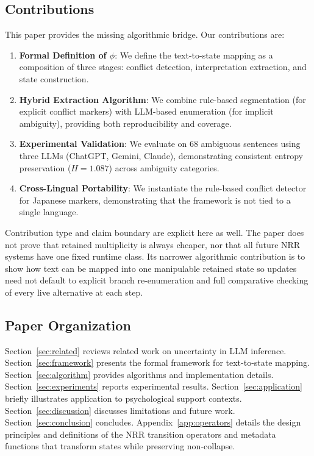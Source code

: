 \documentclass[11pt,a4paper]{article}
\begin{document}
\subsection{Contributions}

This paper provides the missing algorithmic bridge. Our contributions are:

\begin{enumerate}
    \item \textbf{Formal Definition of $\phi$}: We define the text-to-state mapping as a 
          composition of three stages: conflict detection, interpretation extraction, 
          and state construction.
    
    \item \textbf{Hybrid Extraction Algorithm}: We combine rule-based segmentation 
          (for explicit conflict markers) with LLM-based enumeration (for implicit 
          ambiguity), providing both reproducibility and coverage.
    
    \item \textbf{Experimental Validation}: We evaluate on 68 ambiguous sentences 
          using three LLMs (ChatGPT, Gemini, Claude), demonstrating consistent entropy 
          preservation ($H = 1.087$) across ambiguity categories.
    
	    \item \textbf{Cross-Lingual Portability}: We instantiate the rule-based conflict 
	          detector for Japanese markers, demonstrating that the framework is not 
	          tied to a single language.
\end{enumerate}

Contribution type and claim boundary are explicit here as well. The paper does not prove that retained multiplicity is always cheaper, nor that all future NRR systems have one fixed runtime class. Its narrower algorithmic contribution is to show how text can be mapped into one manipulable retained state so updates need not default to explicit branch re-enumeration and full comparative checking of every live alternative at each step.

\subsection{Paper Organization}

Section~\ref{sec:related} reviews related work on uncertainty in LLM inference. 
Section~\ref{sec:framework} presents the formal framework for text-to-state mapping. 
Section~\ref{sec:algorithm} provides algorithms and implementation details. 
Section~\ref{sec:experiments} reports experimental results. 
Section~\ref{sec:application} briefly illustrates application to psychological support contexts. 
Section~\ref{sec:discussion} discusses limitations and future work. 
Section~\ref{sec:conclusion} concludes. 
Appendix~\ref{app:operators} details the design principles and definitions of 
the NRR transition operators and metadata functions that transform states while preserving non-collapse.
\end{document}
